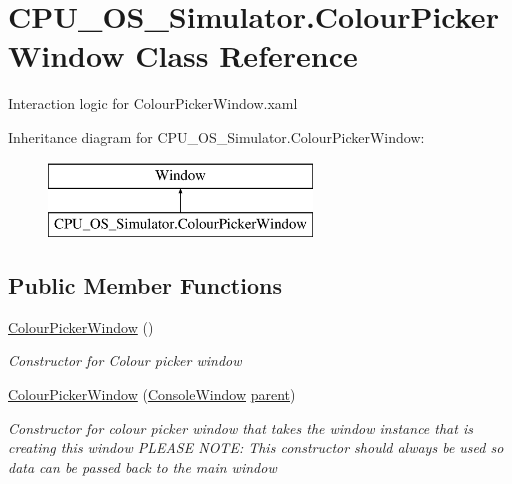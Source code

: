 \hypertarget{class_c_p_u___o_s___simulator_1_1_colour_picker_window}{}\section{C\+P\+U\+\_\+\+O\+S\+\_\+\+Simulator.\+Colour\+Picker\+Window Class Reference}
\label{class_c_p_u___o_s___simulator_1_1_colour_picker_window}


Interaction logic for Colour\+Picker\+Window.\+xaml  


Inheritance diagram for C\+P\+U\+\_\+\+O\+S\+\_\+\+Simulator.\+Colour\+Picker\+Window\+:\begin{figure}[H]
\begin{center}
\leavevmode
\includegraphics[height=2.000000cm]{class_c_p_u___o_s___simulator_1_1_colour_picker_window}
\end{center}
\end{figure}
\subsection*{Public Member Functions}
\begin{DoxyCompactItemize}
\item 
\hyperlink{class_c_p_u___o_s___simulator_1_1_colour_picker_window_afd196933703b7ee4bcac6cbfde73e65f}{Colour\+Picker\+Window} ()
\begin{DoxyCompactList}\small\item\em Constructor for Colour picker window \end{DoxyCompactList}\item 
\hyperlink{class_c_p_u___o_s___simulator_1_1_colour_picker_window_a6d0c7265a93ca643ad296a8664489508}{Colour\+Picker\+Window} (\hyperlink{class_c_p_u___o_s___simulator_1_1_console_window}{Console\+Window} \hyperlink{class_c_p_u___o_s___simulator_1_1_colour_picker_window_a0a40b478316b3e45a63c67347ff9fc63}{parent})
\begin{DoxyCompactList}\small\item\em Constructor for colour picker window that takes the window instance that is creating this window P\+L\+E\+A\+S\+E N\+O\+T\+E\+: This constructor should always be used so data can be passed back to the main window \end{DoxyCompactList}\end{DoxyCompactItemize}
